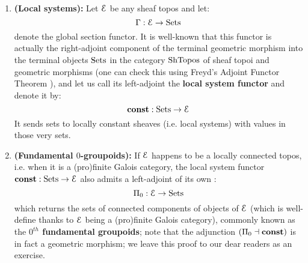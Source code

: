                     \begin{definition} \label{def: fundamental_groupoids}
                        \noindent
                        \begin{enumerate}
                            \item \textbf{(Local systems):} Let $\mathcal{E}$ be any sheaf topos and let:
                                $$\Gamma: \mathcal{E} \to \mathrm{Sets}$$
                            denote the global section functor. It is well-known that this functor is actually the right-adjoint component of the terminal geometric morphism into the terminal objects $\mathrm{Sets}$ in the category $\mathrm{Sh}\mathrm{Topos}$ of sheaf topoi and geometric morphisms (one can check this using Freyd's Adjoint Functor Theorem \cite[Theorem V.6.2]{maclane}), and let us call its left-adjoint the \textbf{local system functor} and denote it by:
                                $$\mathbf{const}: \mathrm{Sets} \to \mathcal{E}$$
                            It sends sets to locally constant sheaves (i.e. local systems) with values in those very sets.
                            \item \textbf{(Fundamental $0$-groupoids):} If $\mathcal{E}$ happens to be a locally connected topos, i.e. when it is a (pro)finite Galois category, the local system functor $\mathbf{const}: \mathrm{Sets} \to \mathcal{E}$ also admits a left-adjoint of its own :
                                $$\Pi_0: \mathcal{E} \to \mathrm{Sets}$$
                            which returns the sets of connected components of objects of $\mathcal{E}$ (which is well-define thanks to $\mathcal{E}$ being a (pro)finite Galois category), commonly known as the \textbf{$0^{th}$ fundamental groupoids}; note that the adjunction $(\Pi_0 \dashv \mathbf{const})$ is in fact a geometric morphism; we leave this proof to our dear readers as an exercise. 
                        \end{enumerate} 
                    \end{definition}
                    
